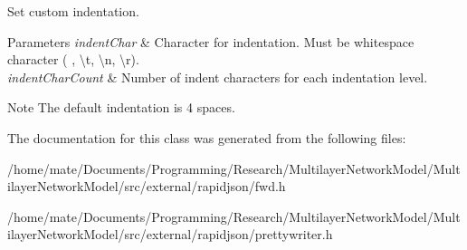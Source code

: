 Set custom indentation. 


\begin{DoxyParams}{Parameters}
{\em indent\+Char} & Character for indentation. Must be whitespace character (\textquotesingle{} \textquotesingle{}, \textquotesingle{}\textbackslash{}t\textquotesingle{}, \textquotesingle{}\textbackslash{}n\textquotesingle{}, \textquotesingle{}\textbackslash{}r\textquotesingle{}). \\
\hline
{\em indent\+Char\+Count} & Number of indent characters for each indentation level. \\
\hline
\end{DoxyParams}
\begin{DoxyNote}{Note}
The default indentation is 4 spaces. 
\end{DoxyNote}


The documentation for this class was generated from the following files\+:\begin{DoxyCompactItemize}
\item 
/home/mate/\+Documents/\+Programming/\+Research/\+Multilayer\+Network\+Model/\+Multilayer\+Network\+Model/src/external/rapidjson/fwd.\+h\item 
/home/mate/\+Documents/\+Programming/\+Research/\+Multilayer\+Network\+Model/\+Multilayer\+Network\+Model/src/external/rapidjson/prettywriter.\+h\end{DoxyCompactItemize}
